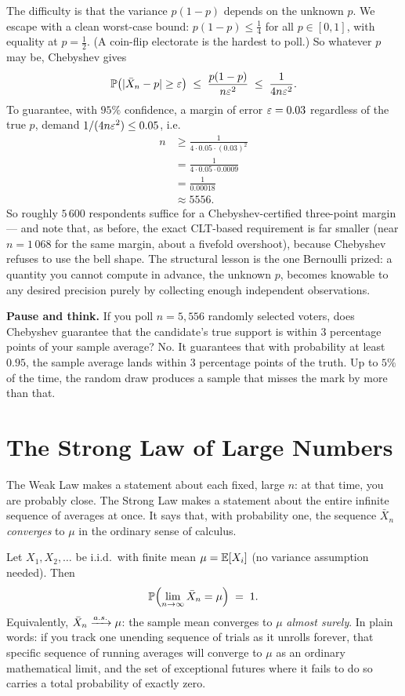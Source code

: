 The difficulty is that the variance $p(1-p)$ depends on the unknown $p$. We escape with a clean worst-case bound: $p(1-p) \le \tfrac14$ for all $p\in[0,1]$, with equality at $p=\tfrac12$. (A coin-flip electorate is the hardest to poll.) So whatever $p$ may be, Chebyshev gives
\[
  \P\bigl(\abs{\bar X_n - p} \ge \eps\bigr) \;\le\; \frac{p(1-p)}{n\eps^2} \;\le\; \frac{1}{4n\eps^2}.
\]
To guarantee, with $95\%$ confidence, a margin of error $\eps = 0.03$ regardless of the true $p$, demand $1/(4n\eps^2) \le 0.05$, i.e.
\begin{align*}
  n &\ge \frac{1}{4\cdot 0.05 \cdot (0.03)^2} \\
  &= \frac{1}{4\cdot 0.05\cdot 0.0009} \\
  &= \frac{1}{0.00018} \\
  &\approx 5556.
\end{align*}
So roughly $5\,600$ respondents suffice for a Chebyshev-certified three-point margin --- and note that, as before, the exact CLT-based requirement is far smaller (near $n=1\,068$ for the same margin, about a fivefold overshoot), because Chebyshev refuses to use the bell shape. The structural lesson is the one Bernoulli prized: a quantity you cannot compute in advance, the unknown $p$, becomes knowable to any desired precision purely by collecting enough independent observations.

\begin{recoverybox}
\textbf{Pause and think.} If you poll $n = 5{,}556$ randomly selected voters, does Chebyshev guarantee that the candidate's true support is within $3$ percentage points of your sample average?
No. It guarantees that with probability at least $0.95$, the sample average lands within $3$ percentage points of the truth. Up to $5\%$ of the time, the random draw produces a sample that misses the mark by more than that.
\end{recoverybox}

\section{The Strong Law of Large Numbers}
\label{ch20:slln}

The Weak Law makes a statement about each fixed, large $n$: at that time, you are probably close. The Strong Law makes a statement about the entire infinite sequence of averages at once. It says that, with probability one, the sequence $\bar X_n$ \emph{converges} to $\mu$ in the ordinary sense of calculus.

\begin{theorem}
\label{ch20:thm-slln}
Let $X_1, X_2, \dots$ be i.i.d.\ with finite mean $\mu = \E[X_i]$ (no variance assumption needed). Then
\[
  \P\Bigl(\lim_{n\to\infty} \bar X_n = \mu\Bigr) \;=\; 1.
\]
Equivalently, $\bar X_n \asto \mu$: the sample mean converges to $\mu$ \emph{almost surely}. In plain words: if you track one unending sequence of trials as it unrolls forever, that specific sequence of running averages will converge to $\mu$ as an ordinary mathematical limit, and the set of exceptional futures where it fails to do so carries a total probability of exactly zero.
\end{theorem}

